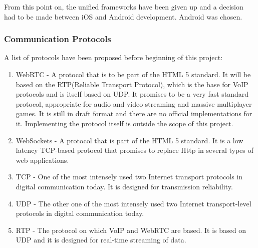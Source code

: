 From this point on, the unified frameworks have been given up and a decision had
to be made between iOS and Android development. Android was chosen.


\subsubsection{Communication Protocols}

A list of protocols have been proposed before beginning of this project: 

\begin{enumerate}
	\item WebRTC - A protocol that is to be part of the HTML 5 standard. It will be
	based on the RTP(Reliable Transport Protocol), which is the base for VoIP
	protocols and is itself based on UDP. It promises to be a very fast standard
	protocol, appropriate for audio and video streaming and massive multiplayer
	games.\cite{webrtc} It is still in draft format and there are no official
	implementations for it. Implementing the protocol itself is outside the scope
	of this project.
	\item WebSockets - A protocol that is part of the HTML 5 standard. It is a low
	latency TCP-based protocol that promises to replace Http in several types of
	web applications.\cite{websockets}
	\item TCP - One of the most intensely used two Internet transport protocols in
	digital communication today. It is designed for transmission reliability.\cite{tcp}
	\item UDP - The other one of the most intensely used two Internet
	transport-level protocols in digital communication today.\cite{udp}
	\item RTP - The protocol on which VoIP and WebRTC are based. It is based on UDP
	and it is designed for real-time streaming of data.\cite{rtp}
\end{enumerate}

